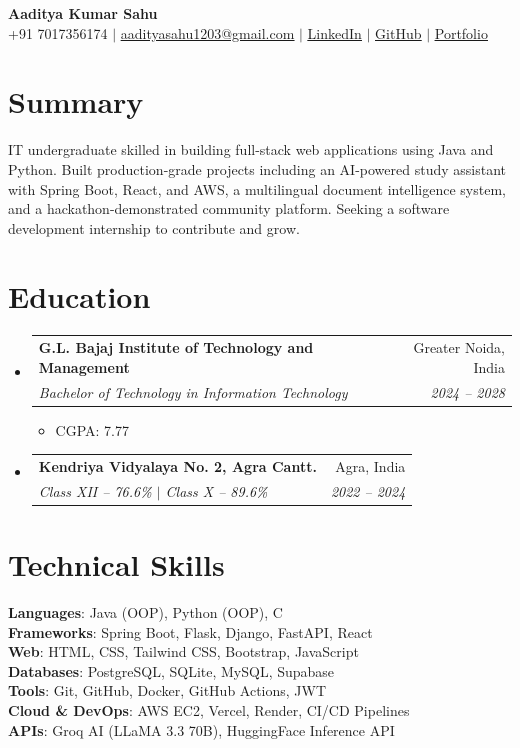 \documentclass[letterpaper,11pt]{article}
\makeatletter
\newcommand{\resumeItem}[1]{
  \item\small{
    {#1 \vspace{-2pt}}
  }
}
\newcommand{\resumeSubheading}[4]{
  \vspace{-2pt}\item
    \begin{tabular*}{0.97\textwidth}[t]{l@{\extracolsep{\fill}}r}
      \textbf{#1} & #2 \\
      \textit{\small#3} & \textit{\small #4} \\
    \end{tabular*}\vspace{-7pt}
}
\newcommand{\resumeSubHeadingListStart}{\begin{itemize}[leftmargin=0.15in, label={}]}
\newcommand{\resumeSubHeadingListEnd}{\end{itemize}}
\newcommand{\resumeItemListStart}{\begin{itemize}}
\newcommand{\resumeItemListEnd}{\end{itemize}\vspace{-5pt}}
\makeatother
\begin{document}
\begin{center}
    \textbf{\Huge Aaditya Kumar Sahu} \\ \vspace{4pt}
    {\small +91 7017356174 $|$
    \href{mailto:aadityasahu1203@gmail.com}{\underline{aadityasahu1203@gmail.com}} $|$
    \href{https://www.linkedin.com/in/aaditya-kumar-sahu-aadicoder/}{\underline{LinkedIn}} $|$
    \href{https://github.com/aadicoder1}{\underline{GitHub}} $|$
    \href{https://aadicoder1.netlify.app}{\underline{Portfolio}}}
\end{center}

\section{Summary}
  \small{
    IT undergraduate skilled in building full-stack web applications using Java and Python. Built production-grade projects including an AI-powered study assistant with Spring Boot, React, and AWS, a multilingual document intelligence system, and a hackathon-demonstrated community platform. Seeking a software development internship to contribute and grow.
  }

\section{Education}
  \resumeSubHeadingListStart
    \resumeSubheading
      {G.L. Bajaj Institute of Technology and Management}{Greater Noida, India}
      {Bachelor of Technology in Information Technology}{2024 -- 2028}
      \resumeItemListStart
        \resumeItem{CGPA: 7.77}
      \resumeItemListEnd
    \resumeSubheading
      {Kendriya Vidyalaya No. 2, Agra Cantt.}{Agra, India}
      {Class XII -- 76.6\% $|$ Class X -- 89.6\%}{2022 -- 2024}
  \resumeSubHeadingListEnd

\section{Technical Skills}
 \begin{itemize}[leftmargin=0.15in, label={}]
    \small{\item{
     \textbf{Languages}{: Java (OOP), Python (OOP), C} \\
     \textbf{Frameworks}{: Spring Boot, Flask, Django, FastAPI, React} \\
     \textbf{Web}{: HTML, CSS, Tailwind CSS, Bootstrap, JavaScript} \\
     \textbf{Databases}{: PostgreSQL, SQLite, MySQL, Supabase} \\
     \textbf{Tools}{: Git, GitHub, Docker, GitHub Actions, JWT} \\
     \textbf{Cloud \& DevOps}{: AWS EC2, Vercel, Render, CI/CD Pipelines} \\
     \textbf{APIs}{: Groq AI (LLaMA 3.3 70B), HuggingFace Inference API} \\
    }}
 \end{itemize}
\end{document}
